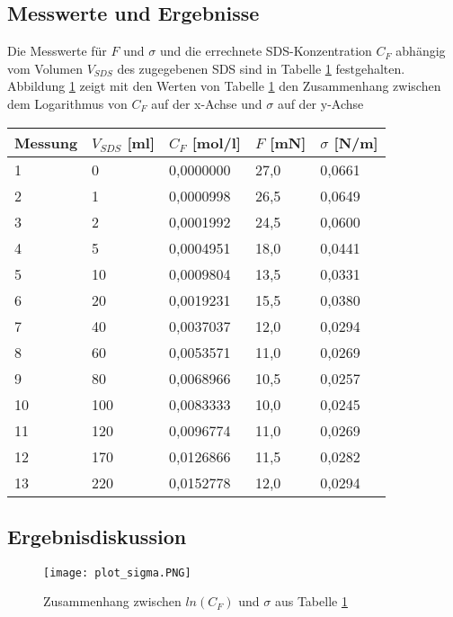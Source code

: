 \documentclass{scrartcl}
\begin{document}
\subsection{Messwerte und Ergebnisse}
Die Messwerte für $F$ und $\sigma$ und die errechnete SDS-Konzentration $C_{F}$ abhängig vom Volumen $V_{SDS}$ des zugegebenen SDS sind in Tabelle \ref{tab:SDS} festgehalten. Abbildung \ref{fig:plot_sigma} zeigt mit den Werten von Tabelle \ref{tab:SDS} den Zusammenhang zwischen dem Logarithmus von $C_{F}$ auf der x-Achse und $\sigma$ auf der y-Achse
\begin{table}[H]
\begin{center}
\begin{tabular}{l|l|l|l|l}
Messung & $V_{SDS}$ [ml]    & $C_{F}$ [mol/l]          & $F$ [mN]     & $\sigma$ [N/m]       \\
\hline
1       & 0   & 0,0000000 & 27,0 & 0,0661 \\
2       & 1   & 0,0000998 & 26,5 & 0,0649 \\
3       & 2   & 0,0001992 & 24,5 & 0,0600 \\
4       & 5   & 0,0004951 & 18,0 & 0,0441 \\
5       & 10  & 0,0009804 & 13,5 & 0,0331 \\
6       & 20  & 0,0019231 & 15,5 & 0,0380 \\
7       & 40  & 0,0037037 & 12,0 & 0,0294 \\
8       & 60  & 0,0053571 & 11,0 & 0,0269 \\
9       & 80  & 0,0068966 & 10,5 & 0,0257 \\
10      & 100 & 0,0083333 & 10,0 & 0,0245 \\
11      & 120 & 0,0096774 & 11,0 & 0,0269 \\
12      & 170 & 0,0126866 & 11,5 & 0,0282 \\
13      & 220 & 0,0152778 & 12,0 & 0,0294
\end{tabular}
\end{center}
\label{tab:SDS}
\end{table}
\subsection{Ergebnisdiskussion}

\begin{figure}[H]
  \centering
    \texttt{[image: plot\_sigma.PNG]}
  \caption{Zusammenhang zwischen $ln(C_{F})$ und $\sigma$ aus Tabelle \ref{tab:SDS}}
  \label{fig:plot_sigma}
\end{figure}
\end{document}

